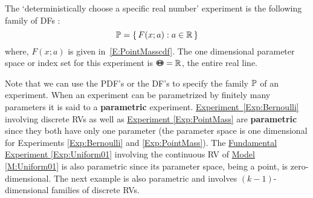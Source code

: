 \begin{Exp}\label{Exp:PointMass}
The `deterministically choose a specific real number' experiment is the following family of DFs :
\[
\mathbb{P} = \{ \,  F(x; a) :  a \in \mathbb{R} \, \} 
\]
where, $F(x; a)$ is given in~\eqref{E:PointMasscdf}.  The one dimensional parameter space or index set for this experiment is ${\Theta}\mspace{-11 mu}{\Theta} = \mathbb{R}$, the entire real line.
\end{Exp}
Note that we can use the PDF's or the DF's to specify the family $\mathbb{P}$ of an experiment.  When an experiment can be parametrized by finitely many parameters it is said to a {\bf parametric} experiment.  \hyperref[Exp:Bernoulli]{Experiment~\ref*{Exp:Bernoulli}} involving discrete RVs as well as \hyperref[Exp:PointMass]{Experiment \ref*{Exp:PointMass}} are {\bf parametric} since they both have only one parameter (the parameter space is one dimensional for Experiments \ref*{Exp:Bernoulli} and \ref*{Exp:PointMass}).   The \hyperref[Uniform01]{Fundamental Experiment \ref*{Exp:Uniform01}} involving the continuous RV of \hyperref[M:Uniform01]{Model \ref*{M:Uniform01}} is also parametric since its parameter space, being a point, is zero-dimensional.  The next example is also parametric and involves $(k-1)$-dimensional families of discrete RVs.

